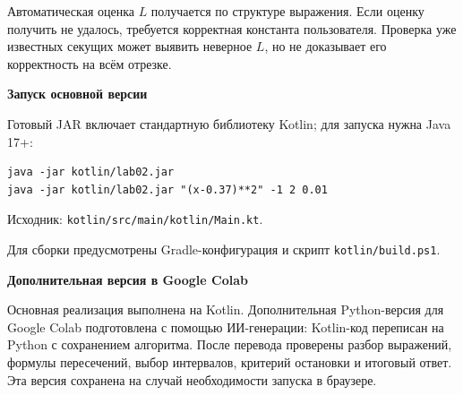 \documentclass[12pt,a4paper]{article}
\begin{document}
Автоматическая оценка $L$ получается по структуре выражения. Если оценку
получить не удалось, требуется корректная константа пользователя.
Проверка уже известных секущих может выявить неверное $L$, но не доказывает
его корректность на всём отрезке.
\par\textbf{Запуск основной версии}\par
Готовый JAR включает стандартную библиотеку Kotlin; для запуска нужна Java 17+:
\begin{Verbatim}[fontsize=\small,breaklines=true]
java -jar kotlin/lab02.jar
java -jar kotlin/lab02.jar "(x-0.37)**2" -1 2 0.01
\end{Verbatim}
Исходник: \texttt{kotlin/src/main/kotlin/Main.kt}.\par
Для сборки предусмотрены Gradle-конфигурация и скрипт \texttt{kotlin/build.ps1}.
\par\textbf{Дополнительная версия в Google Colab}\par
Основная реализация выполнена на Kotlin. Дополнительная Python-версия для
Google Colab подготовлена с помощью ИИ-генерации: Kotlin-код переписан на
Python с сохранением алгоритма. После перевода проверены разбор выражений,
формулы пересечений, выбор интервалов, критерий остановки и итоговый ответ.
Эта версия сохранена на случай необходимости запуска в браузере.
\end{document}
